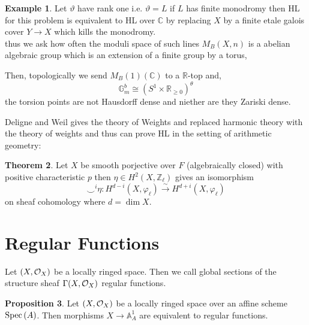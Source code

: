 \documentclass[12pt]{extarticle}
\newcommand{\Z}{\mathbb{Z}}
\newcommand{\R}{\mathbb{R}}
\theoremstyle{definition}
\newtheorem{theorem}{Theorem}[section]
\newtheorem{proposition}[theorem]{Proposition}
\newtheorem{example}[theorem]{Example}
\newenvironment{definition}[1][Definition:]{\begin{trivlist}
\item[\hskip \labelsep {\bfseries #1}]}{\end{trivlist}}
\newcommand{\C}{\mathbb{C}}
\begin{document}
\begin{example}
Let $\vartheta$ have rank one i.e. $\vartheta = L$ if $L$ has finite monodromy then HL for this problem is equivalent to HL over $\C$ by replacing $X$ by a finite etale galois cover $Y \to X$ which kills the monodromy. 
\bigskip\\
thus we ask how often the moduli space of such lines $M_B(X, n)$ is a abelian algebraic group which is an extension of a finite group by a torus,
\begin{center}
\end{center}
Then, topologically we send $M_B(1)(\C)$ to a $\R$-top and,
\[ \mathbb{G}_m^b \cong (S^1 \times \R_{\ge 0} )^{\theta} \]
the torsion points are not Hausdorff dense and niether are they Zariski dense. 
\end{example}

Deligne and Weil gives the theory of Weights and replaced harmonic theory with the theory of weights and thus can prove HL in the setting of arithmetic geometry:

\begin{theorem}
Let $X$ be smooth porjective over $F$ (algebraically closed) with positive characteristic $p$ then $\eta \in H^2(X, \Z_\ell)$ gives an isomorphism
\[ \smile^i \eta : H^{d - i}(X, \varphi_\ell) \xrightarrow{\sim} H^{d + i}(X, \varphi_\ell) \]
on sheaf cohomology where $d = \dim{X}$. 
\end{theorem}

\section{Regular Functions}

\renewcommand{\A}{\mathbb{A}}
\newcommand{\val}{\mathrm{val}}

\begin{definition}
Let $(X, \mathcal{O}_{X})$ be a locally ringed space. Then we call global sections of the structure sheaf $\Gamma(X, \mathcal{O}_{X})$ regular functions.
\end{definition}

\begin{proposition}
Let $(X, \mathcal{O}_{X})$ be a locally ringed space over an affine scheme $\mathrm{Spec}\left(A\right)$. Then morphisms $X \to \A^1_A$ are equivalent to regular functions.
\end{proposition}
\end{document}
